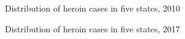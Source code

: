 \documentclass{mcmthesis}
\numberwithin{equation}{section}
\numberwithin{figure}{section}
\numberwithin{table}{section}
\theoremstyle{mydef}
\begin{document}
\begin{figure}[!htbp]
  \caption{Distribution of heroin cases in five states, 2010}\label{fighe10}
\end{figure}
\begin{figure}[!htbp]
  \caption{Distribution of heroin cases in five states, 2017}\label{fighe17}
\end{figure}


 
\end{document}
